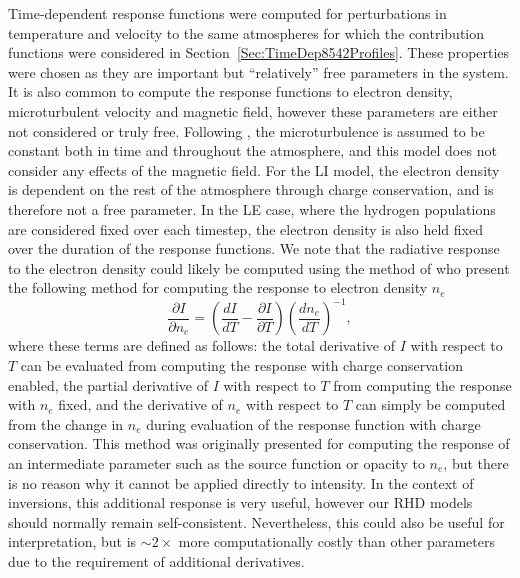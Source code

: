 Time-dependent response functions were computed for perturbations in temperature and velocity to the same atmospheres for which the contribution functions were considered in Section~\ref{Sec:TimeDep8542Profiles}.
These properties were chosen as they are important but ``relatively'' free parameters in the system.
It is also common to compute the response functions to electron density, microturbulent velocity and magnetic field, however these parameters are either not considered or truly free.
Following \Radyn{}, the microturbulence is assumed to be constant both in time and throughout the atmosphere, and this model does not consider any effects of the magnetic field.
For the LI model, the electron density is dependent on the rest of the atmosphere through charge conservation, and is therefore not a free parameter.
In the LE case, where the hydrogen populations are considered fixed over each timestep, the electron density is also held fixed over the duration of the response functions.
We note that the radiative response to the electron density could likely be computed using the method of \citet{Metcalf1990a} who present the following method for computing the response to electron density $n_e$
\begin{equation}
    \frac{\partial I}{\partial n_e} = \left( \frac{dI}{dT} - \frac{\partial I}{\partial T} \right)\left( \frac{d n_e}{dT} \right)^{-1},
\end{equation}
where these terms are defined as follows: the total derivative of $I$ with respect to $T$ can be evaluated from computing the response with charge conservation enabled, the partial derivative of $I$ with respect to $T$ from computing the response with $n_e$ fixed, and the derivative of $n_e$ with respect to $T$ can simply be computed from the change in $n_e$ during evaluation of the response function with charge conservation.
This method was originally presented for computing the response of an intermediate parameter such as the source function or opacity to $n_e$, but there is no reason why it cannot be applied directly to intensity.
In the context of inversions, this additional response is very useful, however our RHD models should normally remain self-consistent.
Nevertheless, this could also be useful for interpretation, but is $\sim2\times$ more computationally costly than other parameters due to the requirement of additional derivatives.

